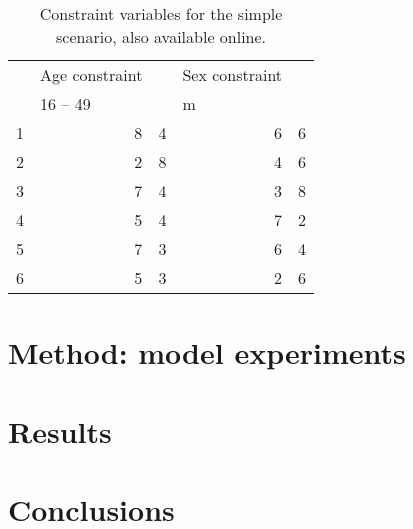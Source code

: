 \documentclass[a4paper,10pt]{article}
\begin{document}
\begin{table}[htbp]
\caption{Constraint variables for the simple scenario, also available online.}
\begin{tabular}{rrrrr}

\multicolumn{1}{l}{} & \multicolumn{1}{c}{Age constraint} & \multicolumn{1}{l}{} & \multicolumn{1}{c}{Sex constraint} & \multicolumn{1}{l}{} \\
\multicolumn{1}{l}{} & \multicolumn{ 2}{l}{16 – 49} & \multicolumn{ 2}{l}{m} \\
1 & 8 & 4 & 6 & 6 \\
2 & 2 & 8 & 4 & 6 \\
3 & 7 & 4 & 3 & 8 \\
4 & 5 & 4 & 7 & 2 \\
5 & 7 & 3 & 6 & 4 \\
6 & 5 & 3 & 2 & 6 \\
\end{tabular}
\label{t2}
\end{table}



\section{Method: model experiments}
\section{Results}
\label{cresults}

\section{Conclusions}


\end{document}
